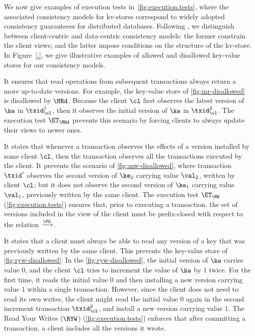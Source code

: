 


We now give examples of execution tests in~\cref{fig:execution.tests},
where the associated consistency models for kv-stores correspond to
widely adopted consistency guaranteees for distributed databases.
Following \cite{distrprinciples}, we distinguish between
client-centric and data-centric consistency models: the former
constrain the client views; and the latter impose conditions on the
structure of the kv-store.  In Figure~\ref{.}, we give illustrative
examples of allowed and disallowed key-value stores for our
consistency models.


It ensures that read operations from subsequent transactions always return a more up-to-date versions.
For example, the key-value store of \cref{fig:mr-disallowed} is disallowed by $\MRd$.
Because the client $\cl$ first observes the latest version of $\ke$ in $\txid_{\cl}^{1}$,
then it observes the initial version of $\ke$ in $\txid_{\cl}^{2}$.
The execution test $\ET_{\MRd}$ prevents this scenario by forcing clients to always update their views to newer ones. 

It states that whenever a transaction observes the effects of a version installed by some client $\cl$,
then the transaction observes all the transactions executed by the client. 
It prevents the scenario of \cref{fig:mw-disallowed}, 
where transaction $\txid'$ observes the second version of $\ke_2$ carrying value $\val_2$, written by client $\cl$;
but it does not observe the second version of $\ke_1$ carrying value $\val_1$, previously written by the same client.
The execution test $\ET_{\MW}$ (\cref{fig:execution.tests}) ensures that, prior to executing a transaction,
the set of versions included in the view of the client must be prefix-closed with respect to the relation $\xrightarrow{\PO}$.

It states that a client must always be able to read any version of a key that was previously written by the same client.
This prevents the key-value store of \cref{fig:ryw-disallowed}. 
In the \cref{fig:ryw-disallowed}, the initial version of $\ke$ carries value $0$, 
and the client $\cl$ tries to increment the value of $\ke$ by $1$ twice.
For the first time, it reads the initial value $0$ and then installing a new version carrying  value $1$ within a single transaction.
However, since the client does not need to read its own writes, 
the client might read the initial value $0$ again in the second increment transaction \( \txid_\cl^2 \),
and install a new version carrying value $1$.
The Read Your Writes ($\RYW$) (\cref{fig:execution.tests}) enforces that after committing a transaction, 
a client includes all the versions it wrote.  

